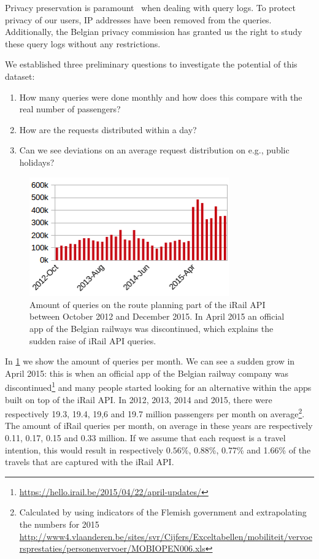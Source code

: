 \documentclass{sig-alternate}
\begin{document}
Privacy preservation is paramount~\cite{silvestri} when dealing with query logs. To protect privacy of our users, IP addresses have been removed from the queries. Additionally, the Belgian privacy commission has granted us the right to study these query logs without any restrictions.

We established three preliminary questions to  investigate the potential of this dataset:
\begin{enumerate}
  \item How many queries were done monthly and how does this compare with the real number of passengers?
  \item How are the requests distributed within a day?
  \item Can we see deviations on an average request distribution on e.g., public holidays?
\end{enumerate}

\begin{figure}
\centering
\includegraphics[width=8.6cm]{querylogs}
\caption{Amount of queries on the route planning part of the iRail API between October 2012 and December 2015. In April 2015 an official app of the Belgian railways was discontinued, which explains the sudden raise of iRail API queries.}
\label{fig:querylogs}
\end{figure}

In \cref{fig:querylogs} we show the amount of queries per month.
We can see a sudden grow in April 2015: this is when an official app of the Belgian railway company was discontinued\footnote{\url{https://hello.irail.be/2015/04/22/april-updates/}} and many people started looking for an alternative within the apps built on top of the iRail API.
In 2012, 2013, 2014 and 2015, there were respectively 19.3, 19.4, 19,6 and 19.7 million passengers per month on average\footnote{Calculated by using indicators of the Flemish government and extrapolating the numbers for 2015 \url{http://www4.vlaanderen.be/sites/svr/Cijfers/Exceltabellen/mobiliteit/vervoersprestaties/personenvervoer/MOBIOPEN006.xls}}.
The amount of iRail queries per month, on average in these years are respectively 0.11, 0.17, 0.15 and 0.33 million.
If we assume that each request is a travel intention, this would result in respectively $0.56\%$, 0.88\%, 0.77\% and 1.66\% of the travels that are captured with the iRail API.
\end{document}
